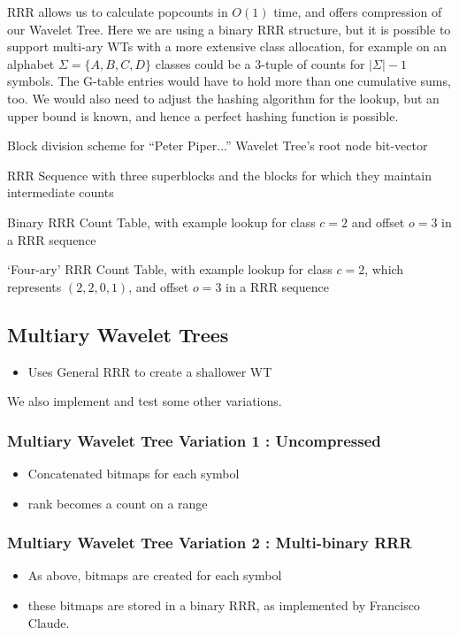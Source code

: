 RRR allows us to calculate popcounts in $O(1)$ time, and offers compression of our Wavelet Tree. Here we are using a binary RRR structure, but it is possible to support multi-ary WTs with a more extensive class allocation, for example on an alphabet $\Sigma = \{ A, B, C, D \}$ classes could be a 3-tuple of counts for $|\Sigma| - 1$ symbols. The G-table entries would have to hold more than one cumulative sums, too. We would also need to adjust the hashing algorithm for the lookup, but an upper bound is known, and hence a perfect hashing function is possible.

			{Block division scheme for ``Peter Piper...'' Wavelet Tree's root
			node bit-vector}

		{RRR Sequence with three superblocks and the blocks for which they
		maintain intermediate counts}

			{Binary RRR Count Table, with example lookup for class $c = 2$
			and offset $o = 3$ in a RRR sequence}

			{`Four-ary' RRR Count Table, with example lookup for class $c = 2$, 
			which represents $(2, 2, 0, 1)$, and offset $o = 3$ in a RRR
			sequence}
			
\subsection{Multiary Wavelet Trees}
\begin{itemize}
\item
  Uses General RRR to create a shallower WT
\end{itemize}
We also implement and test some other variations.



\subsubsection{Multiary Wavelet Tree Variation 1 : Uncompressed}
\begin{itemize}
\item
  Concatenated bitmaps for each symbol
\item
  rank becomes a count on a range
\end{itemize}



\subsubsection{Multiary Wavelet Tree Variation 2 : Multi-binary RRR}
\begin{itemize}
\item
  As above, bitmaps are created for each symbol
\item
  these bitmaps are stored in a binary RRR, as implemented by
  Francisco Claude.
\end{itemize}